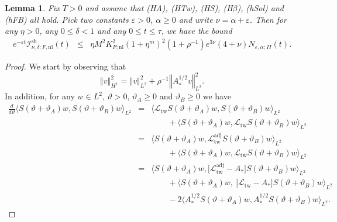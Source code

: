 \documentclass[10pt]{articleHJ}
\newcommand{\e}{\ensuremath{\varepsilon}}
\newcommand{\norm}[1]{\left\Vert#1\right\Vert}		%
\newtheorem{lem}[thm]{Lemma}
\numberwithin{equation}{section}
\begin{document}
\begin{lem}
\label{lem:nls:f:nl:st}
Fix $T > 0$ and assume that (HA), (HTw), (HS), (H$\beta$),
(hSol) and (hFB) all hold.
Pick two constants $\e > 0$, $\alpha \ge 0$
and write $\nu = \alpha + \e$.
Then for any
$\eta > 0$,
any $0 \le \delta < 1$
and any $0 \le t \le \tau$,
we have the bound
\begin{equation}
\begin{array}{lcl}
e^{-\e t} \mathcal{I}^{\mathrm{sh}}_{\nu,\delta;F,\mathrm{nl}}(t) & \le &
 \eta M^2 K_{F;\mathrm{nl}}^2 (1 + \eta^m)^2 (1 + \rho^{-1})
   e^{3 \nu} (4  + \nu)
   N_{\e,\alpha;II}(t) .
\end{array}
\end{equation}
\end{lem}
%
\begin{proof}
We start by observing that
\begin{equation}
\norm{v}_{H^1}^2 = \norm{v}_{L^2}^2 + \rho^{-1} \norm{A_*^{1/2} v}_{L^2}^2.
\end{equation}
In addition, for any $w \in L^2$, $\vartheta > 0$, $\vartheta_A \ge 0$
and $\vartheta_B \ge 0$
we have
\begin{equation}
\label{eq:nls:deriv:semigroup}
\begin{array}{lcl}
\frac{d}{d \vartheta} \langle S(\vartheta + \vartheta_A) w,
   S(\vartheta + \vartheta_B) w \rangle_{L^2}
& = &
  \langle \mathcal{L}_\mathrm{tw} S(\vartheta + \vartheta_A) w ,
     S(\vartheta +\vartheta_B) w \rangle_{L^2}
\\[0.2cm]
& & \qquad
+ \langle  S(\vartheta + \vartheta_A) w ,
    \mathcal{L}_\mathrm{tw}S(\vartheta + \vartheta_B) w \rangle_{L^2}
\\[0.2cm]
& = &
  \langle  S(\vartheta + \vartheta_A) w ,
      \mathcal{L}_\mathrm{tw}^\mathrm{adj} S(\vartheta + \vartheta_B) w \rangle_{L^2}
\\[0.2cm]
& & \qquad
+ \langle  S(\vartheta + \vartheta_A) w ,
   \mathcal{L}_\mathrm{tw}  S(\vartheta + \vartheta_B) w \rangle_{L^2}
\\[0.2cm]
& = &
  \langle  S(\vartheta + \vartheta_A) w ,
     \big[ \mathcal{L}_\mathrm{tw}^\mathrm{adj} - A_*\big]
       S(\vartheta + \vartheta_B) w \rangle_{L^2}
\\[0.2cm]
& & \qquad
+ \langle  S(\vartheta + \vartheta_A) w ,  \
  \big[ \mathcal{L}_\mathrm{tw} - A_*\big]  S(\vartheta + \vartheta_B) w
     \rangle_{L^2}
\\[0.2cm]
& & \qquad
  - 2 \langle A_*^{1/2} S(\vartheta + \vartheta_A) w,
    A_*^{1/2} S(\vartheta + \vartheta_B) w \rangle_{L^2} .
\end{array}
\end{equation}


\end{proof}
\end{document}
